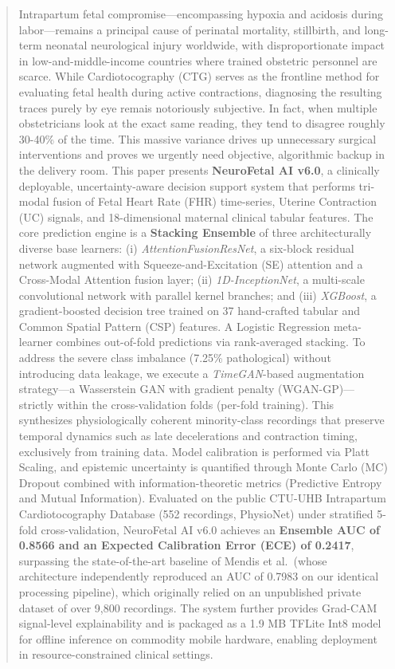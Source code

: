 \documentclass[conference]{IEEEtran}
\begin{document}
\begin{abstract}
Intrapartum fetal compromise—encompassing hypoxia and acidosis during
labor—remains a principal cause of perinatal mortality, stillbirth, and
long-term neonatal neurological injury worldwide, with disproportionate
impact in low-and-middle-income countries where trained obstetric personnel
are scarce. While Cardiotocography (CTG) serves as the frontline method for evaluating fetal health during active contractions, diagnosing the resulting traces purely by eye remais notoriously subjective. In fact, when multiple obstetricians look at the exact same reading, they tend to disagree roughly 30-40\% of the time. This massive variance drives up unnecessary surgical interventions and proves we urgently need objective, algorithmic backup in the delivery room. This paper
presents \textbf{NeuroFetal AI v6.0}, a clinically
deployable, uncertainty-aware decision support system that performs tri-modal
fusion of Fetal Heart Rate (FHR) time-series, Uterine Contraction (UC)
signals, and 18-dimensional maternal clinical tabular features. The core
prediction engine is a \textbf{Stacking Ensemble} of three
architecturally diverse base learners: (i) \textit{AttentionFusionResNet}, a
six-block residual network augmented with Squeeze-and-Excitation (SE)
attention and a Cross-Modal Attention fusion layer; (ii)
\textit{1D-InceptionNet}, a multi-scale convolutional network with parallel
kernel branches; and (iii) \textit{XGBoost}, a gradient-boosted decision tree
trained on 37 hand-crafted tabular and Common Spatial Pattern (CSP) features.
A Logistic Regression meta-learner combines out-of-fold predictions via
rank-averaged stacking. To address the severe class imbalance (7.25\%
pathological) without introducing data leakage, we execute a \textit{TimeGAN}-based augmentation
strategy—a Wasserstein GAN with gradient penalty (WGAN-GP)—strictly within the cross-validation
folds (per-fold training). This synthesizes physiologically coherent
minority-class recordings that preserve temporal dynamics such as
late decelerations and contraction timing, exclusively from training data. Model calibration is performed via
Platt Scaling, and epistemic uncertainty is quantified through Monte Carlo
(MC) Dropout combined with information-theoretic metrics (Predictive Entropy
and Mutual Information). Evaluated on the public CTU-UHB Intrapartum
Cardiotocography Database (552 recordings, PhysioNet) under stratified 5-fold
cross-validation, NeuroFetal AI v6.0 achieves an \textbf{Ensemble AUC of 0.8566 and an Expected Calibration Error (ECE) of 0.2417}, surpassing
the state-of-the-art baseline of Mendis et al.\ (whose architecture independently reproduced an AUC of 0.7983 on our identical processing pipeline), which originally relied on an
unpublished private dataset of over 9,800 recordings. The system further
provides Grad-CAM signal-level explainability and is packaged as a 1.9 MB
TFLite Int8 model for offline inference on commodity mobile hardware, enabling
deployment in resource-constrained clinical settings.


\end{abstract}
\end{document}
